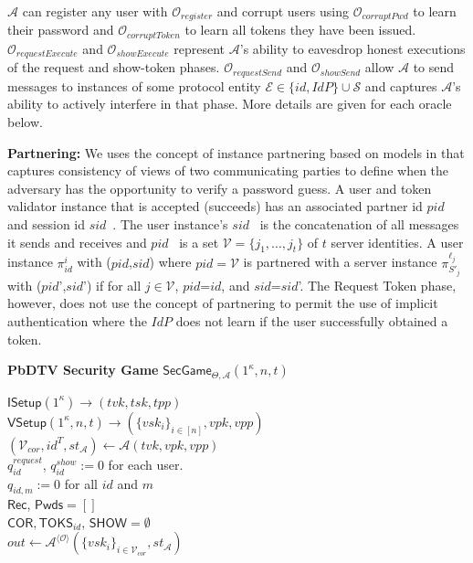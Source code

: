 \documentclass[conference]{IEEEtran}
\newcommand{\cA}{\mathcal{A}}
\newcommand{\cE}{\mathcal{E}}
\newcommand{\cO}{\mathcal{O}}
\newcommand{\cV}{\mathcal{V}}
\newcommand{\secparameter}{\kappa}
\newcommand{\uid}{id}
\newcommand{\tvk}{tvk}
\newcommand{\tsk}{tsk}
\newcommand{\tpp}{tpp}
\newcommand{\vpk}{vpk}
\newcommand{\vsk}{vsk}
\newcommand{\vpp}{vpp}
\newcommand{\pid}{$pid$}
\newcommand{\sid}{$sid$}
\begin{document}
$\cA$ can register any user with $\cO_{register}$ and corrupt users using $\cO_{corruptPwd}$ to learn their password and $\cO_{corruptToken}$ to learn all tokens they have been issued. $\cO_{requestExecute}$ and $\cO_{showExecute}$ represent $\cA$'s ability to eavesdrop honest executions of the request and show-token phases. $\cO_{requestSend}$ and $\cO_{showSend}$ allow $\cA$ to send messages to instances of some protocol entity $\cE \in \{\uid,IdP\}\cup \mathcal{S}$ and captures $\cA$'s ability to actively interfere in that phase. More details are given for each oracle below.

{\bf Partnering:} 
We uses the concept of instance partnering based on models in \cite{T-PAKE-Mackenzie,10.1007/3-540-45539-6_11} that captures consistency of views of two communicating parties to define when the adversary has the opportunity to verify a password guess.
A user and token validator instance that is accepted (succeeds) has an associated  partner id \pid~ and session id \sid~. The user instance's \sid~ is the concatenation of all messages it sends and receives and \pid~ is a set $\cV = \{j_1,...,j_t\}$ of $t$ server identities. A user instance $\pi^{i}_{\uid}$ with (\pid,\sid) where \pid$= \cV$ is partnered with a server instance $\pi^{\ell_{j}}_{S'_{j}}$ with (\pid',\sid') if for all $j \in \cV$, \pid =$\uid$, and \sid =\sid'. The Request Token phase, however, does not use the concept of partnering to permit the use of implicit authentication where the $IdP$ does not learn if the user successfully obtained a token.

\noindent
{\bf PbDTV Security Game} $\mathsf{SecGame}_{\Theta, \cA}(1^{\secparameter}, n,t)$
\label{game:security}
\begin{multicols}{2}
\raggedright
\scriptsize
\noindent $\mathsf{ISetup}(1^{\secparameter}) \rightarrow (\tvk,\tsk,\tpp)$\\
$\mathsf{VSetup}(1^{\secparameter}, n, t) \rightarrow (\{\vsk_{i}\}_{i \in [n]},\vpk,\vpp)$\\
$(\cV_{cor}, \uid^{T}, st_{\cA}) \longleftarrow \cA(\tvk, \vpk, \vpp)$\\
$q^{request}_{\uid}$, $q^{show}_{\uid} := 0$ for each user.\\
$q_{\uid,m} := 0$ for all $\uid$ and $m$\\
$\mathsf{Rec}$, $\mathsf{Pwds} = []$\\
$\mathsf{COR}, \mathsf{TOKS}_{\uid}$, $\mathsf{SHOW} = \emptyset$\\
$out \leftarrow \cA^{\langle \cO \rangle}(\{\vsk_{i}\}_{i \in \cV_{cor}}, st_{\cA})$\\
\end{multicols}
\end{document}
